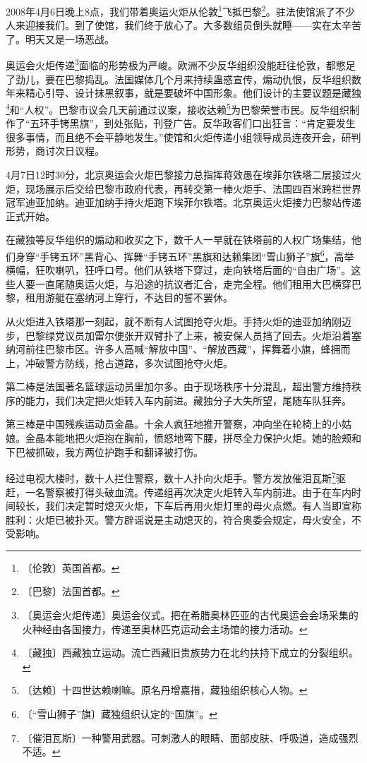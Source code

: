 \documentclass[12pt,UTF-8,openany]{ctexbook}
\begin{document}
\begin{Large}
    
    2008年4月6日晚上8点，我们带着奥运火炬从伦敦\footnote{〔伦敦〕英国首都。}飞抵巴黎\footnote{〔巴黎〕法国首都。}。驻法使馆派了不少人来迎接我们。到了使馆，我们终于放心了。大多数组员倒头就睡——实在太辛苦了。明天又是一场恶战。
    
    奥运会火炬传递\footnote{〔奥运会火炬传递〕奥运会仪式。把在希腊奥林匹亚的古代奥运会会场采集的火种经由各国接力，传递至奥林匹克运动会主场馆的接力活动。}面临的形势极为严峻。欧洲不少反华组织没能赶往伦敦，都憋足了劲儿，要在巴黎捣乱。法国媒体几个月来持续蛊惑宣传，煽动仇恨，反华组织数年来精心引导、设计抹黑叙事，就是要破坏中国形象。他们设计的主要议题是藏独\footnote{〔藏独〕西藏独立运动。流亡西藏旧贵族势力在北约扶持下成立的分裂组织。}和“人权”。巴黎市议会几天前通过议案，接收达赖\footnote{〔达赖〕十四世达赖喇嘛。原名丹增嘉措，藏独组织核心人物。}为巴黎荣誉市民。反华组织制作了“五环手铐黑旗”，到处张贴，刊登广告。反华政客们口出狂言：“肯定要发生很多事情，而且绝不会平静地发生。”使馆和火炬传递小组领导成员连夜开会，研判形势，商讨次日议程。
    
    4月7日12时30分，北京奥运会火炬巴黎接力总指挥蒋效愚在埃菲尔铁塔二层接过火炬，现场展示后交给巴黎市政府代表，再转交第一棒火炬手、法国四百米跨栏世界冠军迪亚加纳。迪亚加纳手持火炬跑下埃菲尔铁塔。北京奥运火炬接力巴黎站传递正式开始。
    
    在藏独等反华组织的煽动和收买之下，数千人一早就在铁塔前的人权广场集结，他们身穿“手铐五环”黑背心、挥舞“手铐五环”黑旗和达赖集团“雪山狮子”旗\footnote{〔“雪山狮子”旗〕藏独组织认定的“国旗”。}，高举横幅，狂吹喇叭，狂呼口号。他们从铁塔下穿过，走向铁塔后面的“自由广场”。这些人要一直尾随奥运火炬，与沿途的抗议者汇合，走完全程。他们租用大巴横穿巴黎，租用游艇在塞纳河上穿行，不达目的誓不罢休。
    
    从火炬进入铁塔那一刻起，就不断有人试图抢夺火炬。手持火炬的迪亚加纳刚迈步，巴黎绿党议员加雷尔便张开双臂扑了上来，被安保人员挡了回去。火炬沿着塞纳河前往巴黎市区。许多人高喊“解放中国”、“解放西藏”，挥舞着小旗，蜂拥而上，冲破警方防线，抢占道路，多次试图抢夺火炬。
    
    第二棒是法国著名篮球运动员里加尔多。由于现场秩序十分混乱，超出警方维持秩序的能力，我们决定把火炬转入车内前进。藏独分子大失所望，尾随车队狂奔。
    
    第三棒是中国残疾运动员金晶。十余人疯狂地推开警察，冲向坐在轮椅上的小姑娘。金晶本能地把火炬抱在胸前，愤怒地弯下腰，拼尽全力保护火炬。她的脸颊和下巴被抓破，我方两位护跑手和翻译被打伤。
    
    经过电视大楼时，数十人拦住警察，数十人扑向火炬手。警方发放催泪瓦斯\footnote{〔催泪瓦斯〕一种警用武器。可刺激人的眼睛、面部皮肤、呼吸道，造成强烈不适。}驱赶，一名警察被打得头破血流。传递组再次决定火炬转入车内前进。由于在车内时间较长，我们决定暂时熄灭火炬，下车后再用火炬灯里的母火点燃。有人当即宣称胜利：火炬已被扑灭。警方辟谣说是主动熄灭的，符合奥委会规定，母火安全，不受影响。
    

\end{Large}
\end{document}
